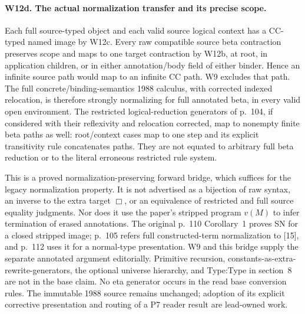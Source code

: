 \paragraph{W12d. The actual normalization transfer and its precise scope.}
Each full source-typed object and each valid source logical context has
a CC-typed named image by W12c. Every raw compatible source beta
contraction preserves scope and maps to one target contraction by W12b,
at root, in application children, or in either annotation/body field of
either binder. Hence an infinite source path would map to an infinite
CC path. W9 excludes that path. The full concrete/binding-semantics
1988 calculus, with corrected indexed relocation, is therefore strongly
normalizing for full annotated beta, in every valid open environment.
The restricted logical-reduction generators of p.~104, if considered
with their reflexivity and relocation corrected, map to nonempty finite
beta paths as well: root/context cases map to one step and its explicit
transitivity rule concatenates paths. They are not equated to arbitrary
full beta reduction or to the literal erroneous restricted rule system.

This is a proved normalization-preserving forward bridge, which suffices
for the legacy normalization property. It is not advertised as a
bijection of raw syntax, an inverse to the extra target \(\Box\),
or an equivalence of restricted and full source equality judgments.
Nor does it use the paper's stripped program \(v(M)\) to infer
termination of erased annotations. The original p.~110 Corollary~1
proves SN for a closed stripped image; p.~105 refers full constructed-term
normalization to [15], and p.~112 uses it for a normal-type presentation.
W9 and this bridge supply the separate annotated argument editorially.
Primitive recursion, constants-as-extra-rewrite-generators, the optional
universe hierarchy, and Type:Type in section~8 are not in the base claim.
No eta generator occurs in the read base conversion rules. The immutable
1988 source remains unchanged; adoption of its explicit corrective
presentation and routing of a P7 reader result are lead-owned work.

